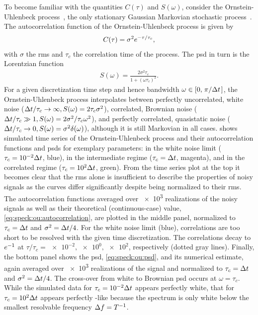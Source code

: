 To become familiar with the quantities $C(\tau)$ and $S(\omega)$, consider the Ornstein-Uhlenbeck process~\cite{Uhlenbeck1930}, the only stationary Gaussian Markovian stochastic process~\cite{VanKampen1976}.
The autocorrelation function of the Ornstein-Uhlenbeck process is given by
\begin{align}\label{eq:speck:ou:autocorrelation}
    C(\tau) = \sigma^2e^{-\tau/\tau_c},
\end{align}
with $\sigma$ the \gls{rms} and $\tau_c$ the correlation time of the process.
The \gls{psd} in turn is the Lorentzian function
\begin{align}\label{eq:speck:ou:psd}
    S(\omega) = \frac{2\sigma^2\tau_c}{1 + (\omega\tau_c)^2}.
\end{align}
For a given discretization time step \dt and hence bandwidth $\omega\in [0, \flatfrac{\pi}{\dt}]$, the Ornstein-Uhlenbeck process interpolates between perfectly uncorrelated, white noise ($\Delta t/\tau_c\to\infty, S(\omega) = 2\tau_c\sigma^2$), correlated, Brownian noise ($\Delta t/\tau_c\gg 1, S(\omega) = 2\sigma^2/\tau_c\omega^2$), and perfectly correlated, quasistatic noise ($\Delta t/\tau_c\to 0, S(\omega) = \sigma^2\delta(\omega)$), although it is still Markovian in all cases.
 shows simulated time series of the Ornstein-Uhlenbeck process and their autocorrelation functions and \glspl{psd} for exemplary parameters: in the white noise limit ($\tau_c = \num{e-2}\Delta t$, blue), in the intermediate regime ($\tau_c = \Delta t$, magenta), and in the correlated regime ($\tau_c = \num{e+2}\Delta t$, green).
From the time series plot at the top it becomes clear that the \gls{rms} alone is insufficient to describe the properties of noisy signals as the curves differ significantly despite being normalized to their \gls{rms}.
The autocorrelation functions averaged over \num{e3} realizations of the noisy signals as well as their theoretical (continuous-case) value, \cref{eq:speck:ou:autocorrelation}, are plotted in the middle panel, normalized to $\tau_c=\Delta t$ and $\sigma^2=\Delta t/4$.
For the white noise limit (blue), correlations are too short to be resolved with the given time discretization.
The correlations decay to $e^{-1}$ at $\tau/\tau_c=\num{e-2},\num{e0},\num{e+2}$, respectively (dotted gray lines).
Finally, the bottom panel shows the \gls{psd}, \cref{eq:speck:ou:psd}, and its numerical estimate, again averaged over \num{e3} realizations of the signal and normalized to $\tau_c=\Delta t$ and $\sigma^2=\Delta t/4$.
The cross-over from white to Brownian \gls{psd} occurs at $\omega = \tau_c$.
While the simulated data for $\tau_c = \num{e-2}\Delta t$ appears perfectly white, that for $\tau_c = \num{e2}\Delta t$ appears perfectly \oneoverf-like because the spectrum is only white below the smallest resolvable frequency $\Delta f = T^{-1}$.

